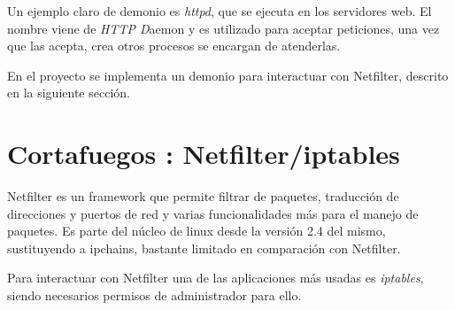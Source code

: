 Un ejemplo claro de demonio es \emph{httpd}, que se ejecuta en los servidores web. El nombre viene de \emph{HTTP D}aemon y es utilizado para aceptar peticiones, una vez que las acepta, crea otros procesos se encargan de atenderlas.
\newline

En el proyecto se implementa un demonio para interactuar con Netfilter, descrito en la siguiente sección.


\section{Cortafuegos : Netfilter/iptables}
\label{sec:introduction:iptables}


Netfilter es un framework que permite filtrar de paquetes, traducci\'on de direcciones y puertos de red y varias funcionalidades m\'as para el manejo de paquetes. Es parte del n\'ucleo de linux desde la versi\'on 2.4 del mismo, sustituyendo a ipchains, bastante limitado en comparaci\'on con Netfilter.
\newline
%
%


Para interactuar con Netfilter una de las aplicaciones más usadas es \emph{iptables}, siendo necesarios permisos de administrador para ello.


